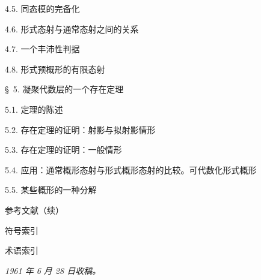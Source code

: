 \documentclass[UTF8,fontset=none,11pt,oneside,openany]{ctexbook}
\newcommand{\oldpage}[2][]{%
  \hypertarget{ega-source-page-#1-#2}{}%
  \marginnote{\scriptsize\textbf{#1}~|~#2}\ignorespaces}
\begin{document}
\begin{flushleft}
4.5. 同态模的完备化 

4.6. 形式态射与通常态射之间的关系 

4.7. 一个丰沛性判据 

4.8. 形式预概形的有限态射 

\oldpage[III]{167}

\S~5. 凝聚代数层的一个存在定理 

5.1. 定理的陈述 

5.2. 存在定理的证明：射影与拟射影情形 

5.3. 存在定理的证明：一般情形 

5.4. 应用：通常概形态射与形式概形态射的比较。可代数化形式概形

5.5. 某些概形的一种分解 

\medskip
\textsc{参考文献（续）} 

\textsc{符号索引} 

\textsc{术语索引} 

\begin{flushright}
\emph{1961 年 6 月 28 日收稿。}
\end{flushright}
\end{flushleft}
\end{document}
